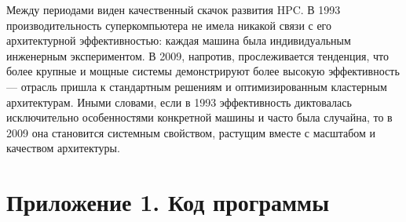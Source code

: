 \documentclass[14pt,a4paper]{extarticle}
\begin{document}
Между периодами виден качественный скачок развития HPC. В 1993
производительность суперкомпьютера не имела никакой связи с его архитектурной
эффективностью: каждая машина была индивидуальным инженерным экспериментом. В
2009, напротив, прослеживается тенденция, что более крупные и мощные системы
демонстрируют более высокую эффективность — отрасль пришла к стандартным
решениям и оптимизированным кластерным архитектурам. Иными словами, если в 1993
эффективность диктовалась исключительно особенностями конкретной машины и часто
была случайна, то в 2009 она становится системным свойством, растущим вместе с
масштабом и качеством архитектуры.

\newpage
\section*{Приложение 1. Код программы}
\end{document}
